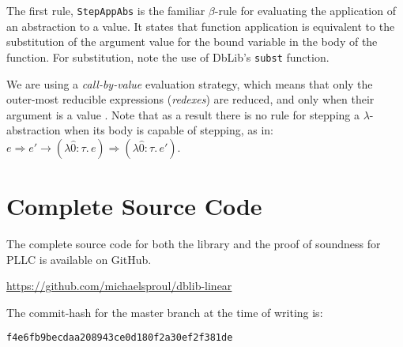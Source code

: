\documentclass[]{unswthesis}
\newcommand{\steps}{\Rightarrow}
\let\c\texttt
\let\i\textit
\begin{document}
The first rule, \c{StepAppAbs} is the familiar $\beta$-rule for evaluating the application of an abstraction to a value. It states that function application is equivalent to the substitution of the argument value for the bound variable in the body of the function. For substitution, note the use of DbLib's \c{subst} function.

We are using a \i{call-by-value} evaluation strategy, which means that only the outer-most reducible expressions (\i{redexes}) are reduced, and only when their argument is a value \cite{tapl}. Note that as a result there is no rule for stepping a $\lambda$-abstraction when its body is capable of stepping, as in: $e \steps e' \longrightarrow (\lambda \hat{0} : \tau. \, e) \steps (\lambda \hat{0} : \tau. \, e')$.

\newpage

\section{Complete Source Code}
\label{sec:src}

The complete source code for both the library and the proof of soundness for PLLC is available on GitHub.

\url{https://github.com/michaelsproul/dblib-linear}

The commit-hash for the master branch at the time of writing is:

\c{f4e6fb9becdaa208943ce0d180f2a30ef2f381de}
\end{document}
